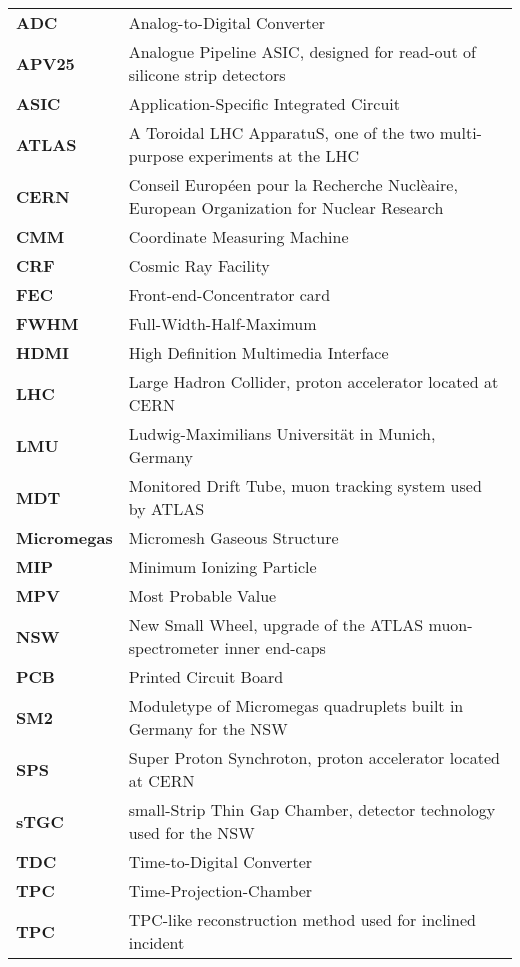 \documentclass[
twoside,            %
BCOR1.4cm,          %
10pt,               %
headings=normal,    %
headsepline,        %
clearplainpage,		%
final,              %
div=14,
open=right,
bibliography=toc
]{scrreprt}
\begin{document}
\begin{table}[!h]
	\centering		
	\begin{tabular}{ll}
		\textbf{ADC} & Analog-to-Digital Converter
		\\[10pt]
		\textbf{APV25} & Analogue Pipeline ASIC, designed for read-out of silicone strip detectors
		\\[10pt]
		\textbf{ASIC} & Application-Specific Integrated Circuit
		\\[10pt]
		\textbf{ATLAS} & A Toroidal LHC ApparatuS, one of the two multi-purpose experiments at the LHC
		\\[10pt]
		\textbf{CERN} & Conseil Europ\'{e}en pour la Recherche Nucl\`{e}aire, European Organization for Nuclear Research
		\\[10pt]
		\textbf{CMM} & Coordinate Measuring Machine
		\\[10pt]
		\textbf{CRF} & Cosmic Ray Facility
		\\[10pt]
		\textbf{FEC} & Front-end-Concentrator card
		\\[10pt]
		\textbf{FWHM} & Full-Width-Half-Maximum
		\\[10pt]
		\textbf{HDMI} & High Definition Multimedia Interface
		\\[10pt]
		\textbf{LHC} & Large Hadron Collider, proton accelerator located at CERN
		\\[10pt]
		\textbf{LMU} & Ludwig-Maximilians Universit\"at in Munich, Germany
		\\[10pt]
		\textbf{MDT} & Monitored Drift Tube, muon tracking system used by ATLAS
		\\[10pt]
		\textbf{Micromegas} & Micromesh Gaseous Structure
		\\[10pt]
		\textbf{MIP} & Minimum Ionizing Particle
		\\[10pt]
		\textbf{MPV} & Most Probable Value
		\\[10pt]
		\textbf{NSW} & New Small Wheel, upgrade of the ATLAS muon-spectrometer inner end-caps
		\\[10pt]
		\textbf{PCB} & Printed Circuit Board
		\\[10pt]
		\textbf{SM2} & Moduletype of Micromegas quadruplets built in Germany for the NSW
		\\[10pt]
		\textbf{SPS} & Super Proton Synchroton, proton accelerator located at CERN
		\\[10pt]
		\textbf{sTGC} & small-Strip Thin Gap Chamber, detector technology used for the NSW
		\\[10pt]
		\textbf{TDC} & Time-to-Digital Converter
		\\[10pt]
		\textbf{TPC} & Time-Projection-Chamber
		\\[10pt]
		\textbf{\textmu TPC} & TPC-like reconstruction method used for inclined incident
	\end{tabular}
\end{table}
\end{document}
